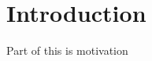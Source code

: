 \documentclass[main.tex]{subfiles}
\begin{document}
    \section{Introduction}
    Part of this is motivation\\
    \blindtext
\end{document}
